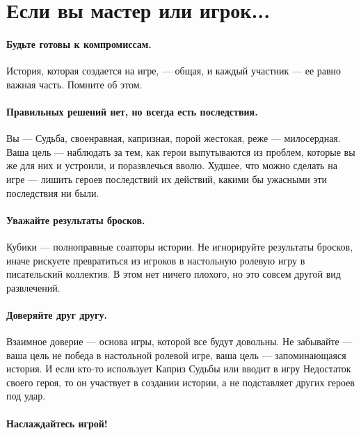 \section*{Если вы мастер или игрок...}

\paragraph{Будьте готовы к компромиссам.} История, которая создается на игре, — общая, и каждый участник — ее равно важная часть. Помните об этом.
\paragraph{Правильных решений нет, но всегда есть последствия.} Вы — Судьба, своенравная, капризная, порой жестокая, реже — милосердная. Ваша цель — наблюдать за тем, как герои выпутываются из проблем, которые вы же для них и устроили, и поразвлечься вволю. Худшее, что можно сделать на игре — лишить героев последствий их действий, какими бы ужасными эти последствия ни были.
\paragraph{Уважайте результаты бросков.} Кубики — полноправные соавторы истории. Не игнорируйте результаты бросков, иначе рискуете превратиться из игроков в настольную ролевую игру в писательский коллектив. В этом нет ничего плохого, но это совсем другой вид развлечений.
\paragraph{Доверяйте друг другу.} Взаимное доверие — основа игры, которой все будут довольны. Не забывайте — ваша цель не победа в настольной ролевой игре, ваша цель — запоминающаяся история. И если кто-то использует Каприз Судьбы или вводит в игру Недостаток своего героя, то он участвует в создании истории, а не подставляет других героев под удар.
\paragraph{Наслаждайтесь игрой!}